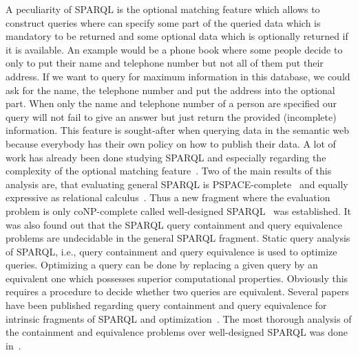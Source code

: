 A peculiarity of SPARQL is the optional 
matching feature which allows to construct queries where can specify some part
of the queried data which is mandatory to be returned and some optional data
which is optionally returned if it is available. An example would be a phone book where some people decide to
only to put their name and telephone number but not all of them put their
address. If we want to query for maximum information in this database, 
we could ask for the name, the telephone number and put the address into the
optional part. When only the name and telephone number of a person are
specified our query will not fail to give an answer but just return the provided (incomplete)
information. This feature is sought-after when querying data in the semantic web
because everybody has their own policy on how to publish their data.
A lot of work has already been done studying SPARQL and especially regarding 
the complexity of the optional matching
feature~\cite{angles2008expressive,perez2006semantics,perez2009semantics,
schmidt2010foundations,arenas2011querying,kaminski_bwd,kostylev2014semantics}.
Two of the main results of this analysis are, that evaluating general SPARQL is
PSPACE-complete~\cite{perez2006semantics} and equally expressive as relational
calculus~\cite{angles2008expressive,polleres2007sparql}.
Thus a new fragment where the evaluation problem is only coNP-complete called well-designed
SPARQL~\cite{perez2009semantics} was established. It was also found out that the
SPARQL query containment and query equivalence problems are undecidable in the
general SPARQL fragment. Static query analysis of SPARQL, i.e., query containment
and query equivalence is used to optimize queries. Optimizing a query can be
done by replacing a given
query by an equivalent one which possesses superior computational properties.
Obviously this requires a procedure to decide whether two queries are equivalent.
Several papers have been published regarding query containment and query equivalence for intrinsic fragments of SPARQL and optimization~\cite{serfiotis2005containment,wudage2012sparql,letelier2012static,letelier2013static,
schmidt2010foundations,chekol2011psparql,stocker2008sparql,bischof2014schema}. 
The most thorough analysis of the containment and equivalence problems over well-designed SPARQL was done in~\cite{pichler2014containment}.

